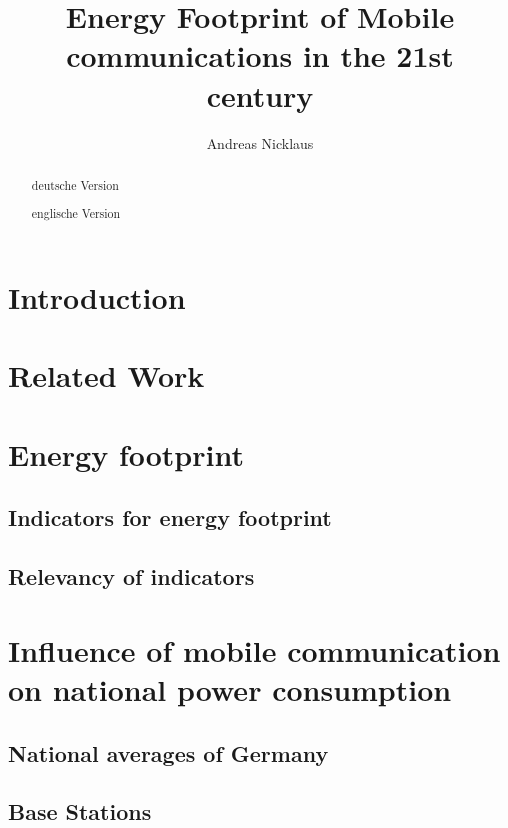 \documentclass[11pt,a4paper]{article}
\title{Energy Footprint of Mobile communications in the 21st century}
\author{Andreas Nicklaus}
\begin{document}
\maketitle

\begin{abstract}
  deutsche Version
\end{abstract}


\begin{abstract}
  englische Version
\end{abstract}

\tableofcontents

\section{Introduction}

\section{Related Work}

\section{Energy footprint}
\subsection{Indicators for energy footprint}
\subsection{Relevancy of indicators}

\section{Influence of mobile communication on national power consumption}
\subsection{National averages of Germany}
\subsection{Base Stations}
\end{document}
